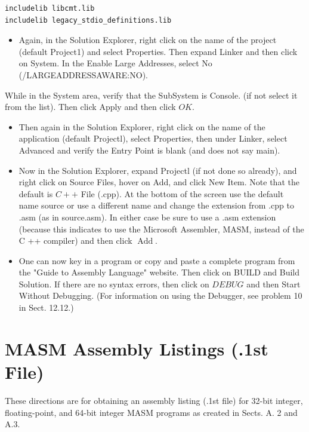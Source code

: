 \documentclass[10pt]{book}
\begin{document}
\begin{verbatim}
includelib libcmt.lib
includelib legacy_stdio_definitions.lib
\end{verbatim}

\begin{itemize}
  \item Again, in the Solution Explorer, right click on the name of the project (default Project1) and select Properties. Then expand Linker and then click on System. In the Enable Large Addresses, select No (/LARGEADDRESSAWARE:NO).
\end{itemize}

While in the System area, verify that the SubSystem is Console. (if not select it from the list). Then click Apply and then click $O K$.

\begin{itemize}
  \item Then again in the Solution Explorer, right click on the name of the application (default Projectl), select Properties, then under Linker, select Advanced and verify the Entry Point is blank (and does not say main).
  \item Now in the Solution Explorer, expand Projectl (if not done so already), and right click on Source Files, hover on Add, and click New Item. Note that the default is $C++$ File (.cpp). At the bottom of the screen use the default name source or use a different name and change the extension from .cpp to .asm (as in source.asm). In either case be sure to use a .asm extension (because this indicates to use the Microsoft Assembler, MASM, instead of the C ++ compiler) and then click $\operatorname{Add}$.
  \item One can now key in a program or copy and paste a complete program from the "Guide to Assembly Language" website. Then click on BUILD and Build Solution. If there are no syntax errors, then click on $D E B U G$ and then Start Without Debugging. (For information on using the Debugger, see problem 10 in Sect. 12.12.)
\end{itemize}

\section{MASM Assembly Listings (.1st File)}
These directions are for obtaining an assembly listing (.1st file) for 32-bit integer, floating-point, and 64-bit integer MASM programs as created in Sects. A. 2 and A.3.
\end{document}
